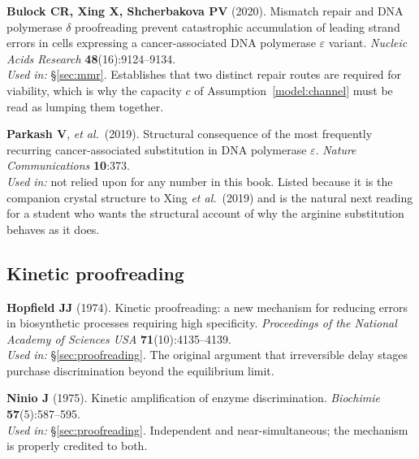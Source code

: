 \begin{refs}
\item \textbf{Bulock CR, Xing X, Shcherbakova PV} (2020). Mismatch repair and DNA
polymerase $\delta$ proofreading prevent catastrophic accumulation of leading
strand errors in cells expressing a cancer-associated DNA polymerase
$\varepsilon$ variant. \emph{Nucleic Acids Research} \textbf{48}(16):9124--9134.
\\[0.15em]
\emph{Used in:} §\ref{sec:mmr}. Establishes that two distinct repair routes are
required for viability, which is why the capacity $c$ of
Assumption~\ref{model:channel} must be read as lumping them together.

\item \textbf{Parkash V}, \emph{et al.}\ (2019). Structural consequence of the most
frequently recurring cancer-associated substitution in DNA polymerase
$\varepsilon$. \emph{Nature Communications} \textbf{10}:373.
\\[0.15em]
\emph{Used in:} not relied upon for any number in this book. Listed because it is
the companion crystal structure to Xing \emph{et al.}\ (2019) and is the natural
next reading for a student who wants the structural account of why the arginine
substitution behaves as it does.
\end{refs}

\subsection*{Kinetic proofreading}

\begin{refs}
\item \textbf{Hopfield JJ} (1974). Kinetic proofreading: a new mechanism for
reducing errors in biosynthetic processes requiring high specificity.
\emph{Proceedings of the National Academy of Sciences USA}
\textbf{71}(10):4135--4139. 
\\[0.15em]
\emph{Used in:} §\ref{sec:proofreading}. The original argument that irreversible
delay stages purchase discrimination beyond the equilibrium limit.

\item \textbf{Ninio J} (1975). Kinetic amplification of enzyme discrimination.
\emph{Biochimie} \textbf{57}(5):587--595.
\\[0.15em]
\emph{Used in:} §\ref{sec:proofreading}. Independent and near-simultaneous; the
mechanism is properly credited to both.
\end{refs}

